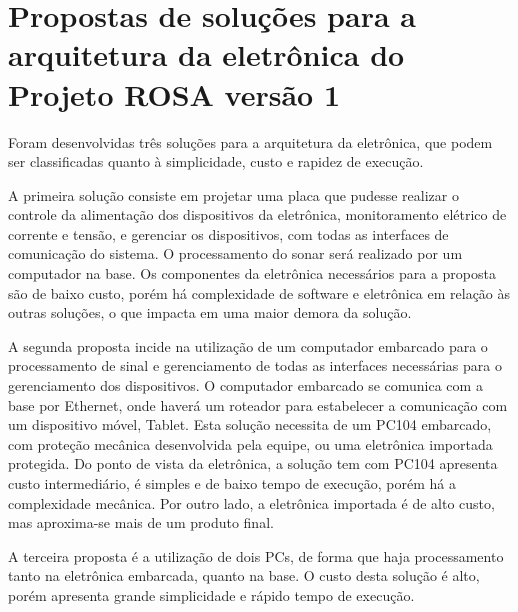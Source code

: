 


\section{Propostas de soluções para a arquitetura da eletrônica do Projeto ROSA
versão 1}

Foram desenvolvidas três soluções para a arquitetura da eletrônica, que podem
ser classificadas quanto à simplicidade, custo e rapidez de execução.

A primeira solução consiste em projetar uma placa que pudesse realizar o
controle da alimentação dos dispositivos da eletrônica, monitoramento elétrico
de corrente e tensão, e gerenciar os dispositivos, com todas as interfaces de
comunicação do sistema. O processamento do sonar será realizado por um
computador na base. Os componentes da eletrônica necessários para a proposta são de baixo
custo, porém há complexidade de software e eletrônica em relação às outras
soluções, o que impacta em uma maior demora da solução.

A segunda proposta incide na utilização de um computador embarcado para o
processamento de sinal e gerenciamento de todas as interfaces necessárias para o gerenciamento
dos dispositivos. O computador embarcado se comunica com a base por Ethernet,
onde haverá um roteador para estabelecer a comunicação com um dispositivo móvel,
Tablet.
Esta solução necessita de um PC104 embarcado, com proteção mecânica desenvolvida
pela equipe, ou uma eletrônica importada protegida. Do ponto de vista da
eletrônica, a solução tem com PC104 apresenta custo intermediário, é simples e
de baixo tempo de execução, porém há a complexidade mecânica. Por outro lado, a
eletrônica importada é de alto custo, mas aproxima-se mais de um produto final.

A terceira proposta é a utilização de dois PCs, de forma que haja processamento
tanto na eletrônica embarcada, quanto na base. O custo desta solução é alto,
porém apresenta grande simplicidade e rápido tempo de execução.